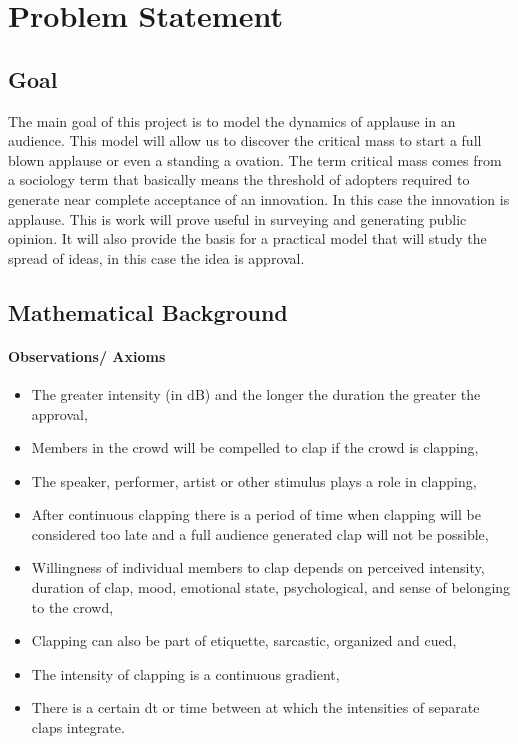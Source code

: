 \documentclass[12pt,letterpaper]{article}
\theoremstyle{definition}
\begin{document}
\section{Problem Statement}
\subsection{Goal} %
The main goal of this project is to model the dynamics of applause in an audience. This model will allow us to discover the critical mass to start a full blown applause or even a standing a ovation. The term critical mass comes from a sociology term that basically means the threshold of adopters required to generate near complete acceptance of an innovation. In this case the innovation is applause. This is work will prove useful in surveying and generating public opinion. It will also provide the basis for a practical model that will study the spread of ideas, in this case the idea is approval. 
\subsection{Mathematical Background}%

\paragraph{Observations/ Axioms}
    \begin{itemize}
	\item The greater intensity (in dB) and the longer the duration the greater the approval,
	\item Members in the crowd will be compelled to clap if the crowd is clapping,
	\item The speaker, performer, artist or other stimulus plays a role in clapping,
	\item After continuous clapping there is a period of time when clapping will be considered too late and a full audience generated clap will not be possible,
	\item Willingness of individual members to clap depends on perceived intensity, duration of clap, mood, emotional state, psychological, and sense of belonging to the crowd,
	\item Clapping can also be part of etiquette, sarcastic, organized and cued,
	\item The intensity of clapping is a continuous gradient,
	\item There is a certain dt or time between at which the intensities of separate claps integrate.
		\end{itemize}
\end{document}
